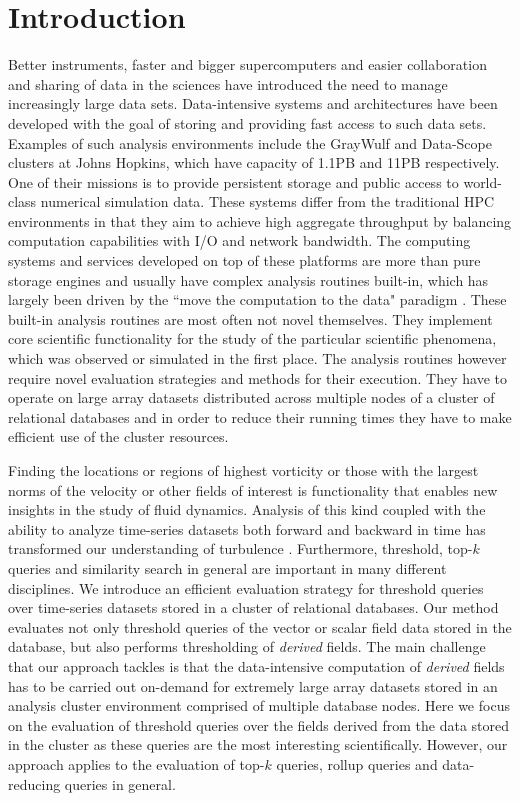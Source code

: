 \documentclass{sig-alternate}
\begin{document}
\section{Introduction}
Better instruments, faster and bigger supercomputers and easier collaboration and sharing of data in the sciences have introduced the need
to manage increasingly large data sets. Data-intensive systems and architectures have been developed with the goal of storing and providing
fast access to such data sets. Examples of such analysis environments include the GrayWulf and Data-Scope clusters \cite{Szalay, DataScope} at 
Johns Hopkins, which have capacity of 1.1PB and 11PB
respectively. One of their missions is to provide persistent storage and public access to world-class numerical simulation data. 
These systems differ from the traditional HPC environments in that they aim to achieve high aggregate throughput by balancing computation
capabilities with I/O and network bandwidth. The computing systems and services developed on top of these platforms are more than pure
storage engines and usually have complex analysis routines built-in, which has largely been driven by the ``move the computation to the data"
paradigm \cite{fourthparadigm}. These built-in analysis routines are most often not novel themselves. They implement core scientific functionality for the
study of the particular scientific phenomena, which was observed or simulated in the first place. The analysis routines however require novel evaluation
strategies and methods for their execution. They have to operate on large array datasets distributed across multiple nodes of a cluster of relational
databases and in order to reduce their running times they have to make efficient use of the cluster resources. 

Finding the locations or regions of highest vorticity or those with the largest norms of the velocity or other fields of interest is
functionality that enables new insights in the study of fluid dynamics. Analysis of this kind coupled with the ability to analyze time-series datasets both 
forward and backward in time has transformed our understanding of turbulence \cite{Eyink}. Furthermore, threshold, top-$k$ queries and similarity search
in general are important in many different disciplines. We introduce an efficient evaluation strategy for threshold
queries over time-series datasets stored in a cluster of relational databases. Our method evaluates not only threshold queries of the vector or 
scalar field data stored in the database, but also performs thresholding of \emph{derived} fields. The main challenge that our approach tackles is that the
data-intensive computation of \emph{derived} fields has to be carried out on-demand for extremely large array datasets stored in an analysis cluster environment 
comprised of multiple database nodes. Here we focus on the evaluation of threshold queries over the fields derived from the data stored in the cluster as
these queries are the most interesting scientifically. However, our approach applies to the evaluation of top-$k$ queries, rollup queries and data-reducing 
queries in general.
\end{document}
